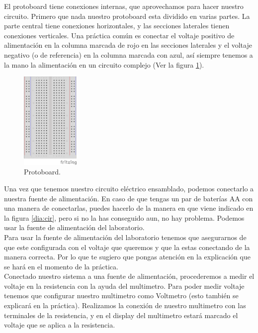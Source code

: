     El protoboard tiene conexiones internas, que aprovechamos para hacer nuestro circuito. Primero que nada nuestro protoboard esta dividido en varias partes. La parte central tiene conexiones horizontales, y las secciones laterales tienen conexiones verticales. Una práctica común es conectar el voltaje positivo de alimentación en la columna marcada de rojo en las secciones laterales y el voltaje negativo (o de referencia) en la columna marcada con azul, así siempre tenemos a la mano la alimentación en un circuito complejo (Ver la figura \ref{dia:proto}). \\

    \begin{figure}[h]
    	\begin{center}
    		\includegraphics[width=0.25\textwidth]{protoboard.png} %
    		\caption{Protoboard.}
    		\label{dia:proto}
    	\end{center}
    \end{figure}

    Una vez que tenemos nuestro circuito eléctrico ensamblado, podemos conectarlo a nuestra fuente de alimentación. En caso de que tengas un par de baterías AA con una manera de conectarlas, puedes hacerlo de la manera en que viene indicado en la figura \ref{dia:cir}, pero si no la has conseguido aun, no hay problema. Podemos usar la fuente de alimentación del laboratorio. \\

    Para usar la fuente de alimentación del laboratorio tenemos que asegurarnos de que este configurada con el voltaje que queremos y que la estas conectando de la manera correcta. Por lo que te sugiero que pongas atención en la explicación que se hará en el momento de la práctica. \\

    Conectado nuestro sistema a una fuente de alimentación, procederemos a medir el voltaje en la resistencia con la ayuda del multimetro. Para poder medir voltaje tenemos que configurar nuestro multimetro como Voltmetro (esto también se explicará en la práctica). Realizamos la conexión de nuestro multimetro con las terminales de la resistencia, y en el display del multimetro estará marcado el voltaje que se aplica a la resistencia. \\

